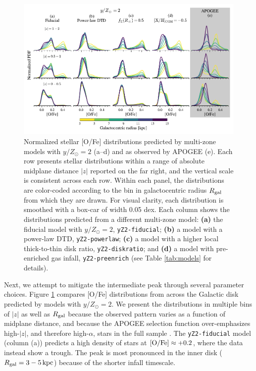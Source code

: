 \documentclass[twocolumn,twocolappendix,linenumbers]{aastex631}
\newcommand{\mathOFe}{{\rm [O/Fe]}}
\newcommand{\yZ}[1]{$y/Z_\odot=#1$}
\newcommand{\kpc}{\,{\rm kpc}}
\begin{document}
\begin{figure}
    \centering
    \includegraphics[width=\textwidth]{figures/ofe_distributions.pdf}
    \caption{Normalized stellar [O/Fe] distributions predicted by multi-zone models with \yZ{2} (a--d) and as observed by APOGEE (e). Each row presents stellar distributions within a range of absolute midplane distance $|z|$ reported on the far right, and the vertical scale is consistent across each row. Within each panel, the distributions are color-coded according to the bin in galactocentric radius $R_{\rm gal}$ from which they are drawn. 
    For visual clarity, each distribution is smoothed with a box-car of width 0.05 dex.
    Each column shows the distributions predicted from a different multi-zone model: {\bf (a)} the fiducial model with \yZ{2}, {\tt yZ2-fiducial}; {\bf (b)} a model with a power-law DTD, {\tt yZ2-powerlaw}; {\bf (c)} a model with a higher local thick-to-thin disk ratio, {\tt yZ2-diskratio}; and {\bf (d)} a model with pre-enriched gas infall, {\tt yZ2-preenrich} (see Table \ref{tab:models} for details). 
    }
    \label{fig:ofe-distribution-parameters}
\end{figure}

Next, we attempt to mitigate the intermediate peak through several parameter choices. Figure \ref{fig:ofe-distribution-parameters} compares [O/Fe] distributions from across the Galactic disk predicted by models with \yZ{2}. We present the distributions in multiple bins of $|z|$ as well as $R_{\rm gal}$ because the observed pattern varies as a function of midplane distance, and because the APOGEE selection function over-emphasizes high-$|z|$, and therefore high-$\alpha$, stars in the full sample \citep[see Figure 5 from][]{vincenzo_distribution_2021}. The {\tt yZ2-fiducial} model (column (a)) predicts a high density of stars at $\mathOFe\approx+0.2$, where the data instead show a trough. The peak is most pronounced in the inner disk ($R_{\rm gal}=3-5\kpc$) because of the shorter infall timescale.
\end{document}
